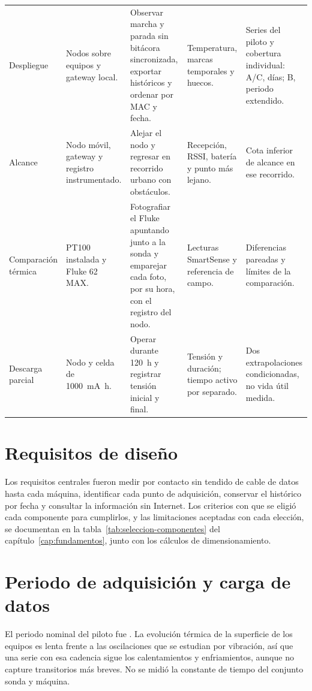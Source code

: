 \begin{longtable}{@{}>{\raggedright\arraybackslash}p{2.05cm}>{\raggedright\arraybackslash}p{2.65cm}>{\raggedright\arraybackslash}p{4.0cm}>{\raggedright\arraybackslash}p{2.8cm}>{\raggedright\arraybackslash}p{3.1cm}@{}}
Despliegue & Nodos sobre equipos y gateway local. & Observar marcha y parada sin bitácora sincronizada, exportar históricos y ordenar por MAC y fecha. & Temperatura, marcas temporales y huecos. & Series del piloto y cobertura individual: A/C, \DuracionComunDias{} días; B, periodo extendido. \\
Alcance & Nodo móvil, gateway y registro instrumentado. & Alejar el nodo y regresar en recorrido urbano con obstáculos. & Recepción, RSSI, batería y punto más lejano. & Cota inferior de alcance en ese recorrido. \\
Comparación térmica & PT100 instalada y Fluke 62 MAX. & Fotografiar el Fluke apuntando junto a la sonda y emparejar cada foto, por su hora, con el registro del nodo. & Lecturas SmartSense y referencia de campo. & Diferencias pareadas y límites de la comparación. \\
Descarga parcial & Nodo y celda de \SI{1000}{\milli\ampere\hour}. & Operar durante \SI{120}{\hour} y registrar tensión inicial y final. & Tensión y duración; tiempo activo por separado. & Dos extrapolaciones condicionadas, no vida útil medida. \\
\end{longtable}
\endgroup

\section{Requisitos de diseño}
Los requisitos centrales fueron medir por contacto sin tendido de cable de datos hasta cada máquina, identificar cada punto de adquisición, conservar el histórico por fecha y consultar la información sin Internet. Los criterios con que se eligió cada componente para cumplirlos, y las limitaciones aceptadas con cada elección, se documentan en la tabla~\ref{tab:seleccion-componentes} del capítulo~\ref{cap:fundamentos}, junto con los cálculos de dimensionamiento.

\section{Periodo de adquisición y carga de datos}
\label{sec:metodo-muestreo}
El periodo nominal del piloto fue \PeriodoNominal{}. La evolución térmica de la superficie de los equipos es lenta frente a las oscilaciones que se estudian por vibración, así que una serie con esa cadencia sigue los calentamientos y enfriamientos, aunque no capture transitorios más breves. No se midió la constante de tiempo del conjunto sonda y máquina.


